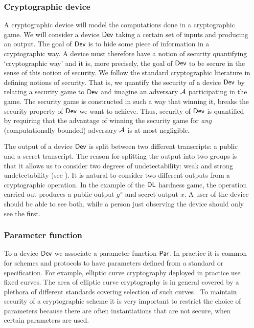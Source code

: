 \subsubsection*{Cryptographic device}

A cryptographic device will model the computations done in a cryptographic game. We will consider a device $\operatorname{\mathsf{Dev}}$ taking a certain set of inputs and producing an output. The goal of $\operatorname{\mathsf{Dev}}$ is to hide some piece of information in a cryptographic way. A device must therefore have a notion of security quantifying `cryptographic way' and it is, more precisely, the goal of $\operatorname{\mathsf{Dev}}$ to be secure in the sense of this notion of security. We follow the standard cryptographic literature in defining notions of security. That is, we quantify the security of a device $\operatorname{\mathsf{Dev}}$ by relating a security game to $\operatorname{\mathsf{Dev}}$ and imagine an adversary $\mathcal{A}$ participating in the game. The security game is constructed in such a way that winning it, breaks the security property of $\operatorname{\mathsf{Dev}}$ we want to achieve. Thus, security of $\operatorname{\mathsf{Dev}}$ is quantified by requiring that the advantage of winning the security game for \emph{any} (computationally bounded) adversary $\mathcal{A}$ is at most negligible.  

The output of a device $\operatorname{\mathsf{Dev}}$ is split between two different transcripts: a public and a secret transcript. The reason for splitting the output into two groups is that it allows us to consider two degrees of undetectability: weak and strong undetectability (see ). It is natural to consider two different outputs from a cryptographic operation. In the example of the $\mathsf{DL}$ hardness game, the operation carried out produces a public output $g^x$ and secret output $x$. A user of the device should be able to see both, while a person just observing the device should only see the first. 

\subsubsection*{Parameter function}

To a device $\operatorname{\mathsf{Dev}}$ we associate a parameter function $\operatorname{\mathsf{Par}}$. In practice it is common for schemes and protocols to have parameters defined from a standard or specification. For example, elliptic curve cryptography deployed in practice use fixed curves. The area of elliptic curve cryptography is in general covered by a plethora of different standards covering selection of such curves \cite{safecurves}. To maintain security of a cryptographic scheme it is very important to restrict the choice of parameters because there are often instantiations that are not secure, when certain parameters are used. 


